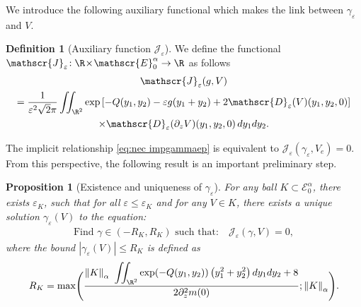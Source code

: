 \documentclass[JEP,XML,SOM,Unicode]{cedram}
\let\mathcal\mathscr
\theoremstyle{plain}
\newtheorem{prop}[thm]{Proposition}
\theoremstyle{definition}
\newtheorem{definition}[thm]{Definition}
\newcommand{\D}{\mathcal{D}_\eps}
\newcommand{\Je}{\mathcal{J}_\eps}
\let\eps\varepsilon
\let\ds\displaystyle
\newcommand{\abs}[1]{\left\lvert#1\right\rvert}
\newcommand{\nalph}[1]{\left\lVert#1\right\rVert_\alpha}
\newcommand{\Eaz}{\mathcal{E}^\alpha_0}
\newcommand{\RK}{R_K}
\begin{document}
We introduce the following auxiliary functional which makes the link between $\gamma_\eps$ and $V$.
\begin{definition}[Auxiliary function $\Je$]
We define the functional \hbox{$\Je\!:\R\!\times\!\Eaz \to \R$} as follows
\begin{multline}\label{eq:def_Jeps}
\Je(g,V)\\
= \dfrac{1}{\eps^2 \sqrt{2}\pi }\iint_{\R^2} \exp\left[-Q(y_1,y_2) - \eps g (y_1+y_2) +2 \D(V)(y_1,y_2,0) \right]\\
\times \D(\partial_z V)(y_1,y_2,0) \, d y_1 d y_2.
\end{multline}
\end{definition}
The implicit relationship \eqref{eq:nec impgammaep} is equivalent to $\Je(\gamma_\eps,V_e) = 0$. From this perspective,
the following result is an important preliminary step.
\begin{prop}[Existence and uniqueness of $\gamma_\eps$]\label{existunique gammaeps}
For any ball $K \subset \Eaz$, there exists $\eps_K$, such that for all $\eps \leq \eps_K$ and for any $V \in K $, there exists a unique solution $\gamma_\eps(V) $ to the equation:
\begin{align*}
\text{Find $\gamma\in (-\RK,\RK)$ such that:} \quad\Je(\gamma,V) = 0,
\end{align*}
where the bound $\abs{\gamma_\eps(V)} \leq \RK$ is defined as
\begin{equation}\label{def G+G-}
\RK= \max \Biggl(\ds \dfrac{\ds \nalph{K} \ \iint _{\R^2} \exp(-Q (y_1,y_2)) \left (y_1^2 + y_2^2 \right) dy_1dy_2 +8}{ 2 \partial_z^2 m(0)} ; \nalph{K} \Biggr).
\end{equation}
\end{prop}
\end{document}
